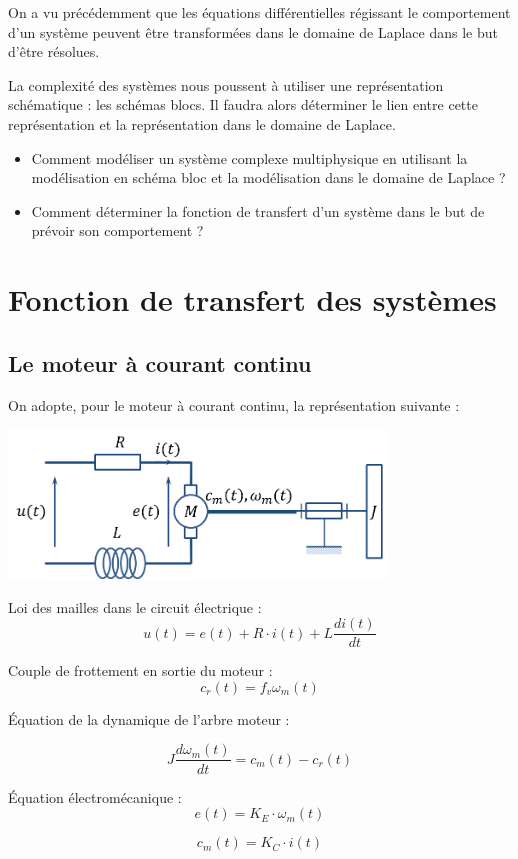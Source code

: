 \documentclass[10pt,fleqn]{article} %
\begin{document}




On a vu précédemment que les équations différentielles régissant le comportement d'un système peuvent être transformées dans le domaine de Laplace dans le but d'être résolues. 

La complexité des systèmes nous poussent à utiliser une représentation schématique : les schémas blocs. Il faudra alors déterminer le lien entre cette représentation et la représentation dans le domaine de Laplace.



\begin{itemize}
\item Comment modéliser un système complexe multiphysique en utilisant la modélisation en schéma bloc et la modélisation dans le domaine de Laplace ?
\item Comment déterminer la fonction de transfert d'un système dans le but de prévoir son comportement ?
\end{itemize}

\section{Fonction de transfert des systèmes}
\subsection{Le moteur à courant continu}

On adopte, pour le moteur à courant continu, la représentation suivante :
\begin{center}
\includegraphics[width=10cm]{images/modele_mcc.png} 
\end{center}

\begin{multicols}{2}
Loi des mailles dans le circuit électrique : 
$$
u(t)=e(t)+R\cdot i(t) + L\dfrac{di(t)}{dt}
$$

Couple de frottement en sortie du moteur : 
$$
c_r(t) = f_v \omega_m(t)
$$



Équation de la dynamique de l'arbre moteur :

$$
J\dfrac{d\omega_m(t)}{dt} = c_m(t) - c_r(t)
$$

Équation électromécanique :
$$
e(t)=K_E \cdot \omega_m(t)
$$

$$
c_m(t)=K_C \cdot i(t)
$$
\end{multicols}
\end{document}
